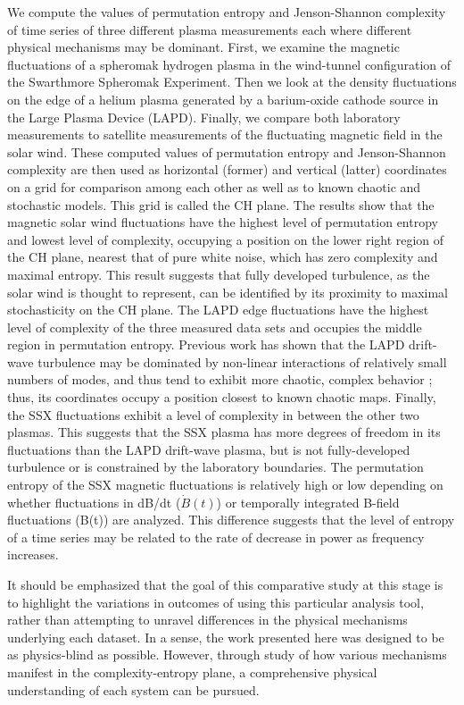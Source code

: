 \documentclass[aps,prx,twocolumn,secnumarabic,nobalancelastpage,amsmath,amssymb,
nofootinbib]{revtex4-1}
\begin{document}
We compute the values of permutation entropy and Jenson-Shannon complexity of time series of three different plasma measurements each where different physical mechanisms may be dominant. First, we examine the magnetic fluctuations of a spheromak hydrogen plasma in the wind-tunnel configuration of the Swarthmore Spheromak Experiment. Then we look at the density fluctuations on the edge of a helium plasma generated by a barium-oxide cathode source in the Large Plasma Device (LAPD). Finally, we compare both laboratory measurements to satellite measurements of the fluctuating magnetic field in the solar wind. These computed values of permutation entropy and Jenson-Shannon complexity are then used as horizontal (former) and vertical (latter) coordinates on a grid for comparison among each other as well as to known chaotic and stochastic models. This grid is called the CH plane. The results show that the magnetic solar wind fluctuations have the highest level of permutation entropy and lowest level of complexity, occupying a position on the lower right region of the CH plane, nearest that of pure white noise, which has zero complexity and maximal entropy. This result suggests that fully developed turbulence, as the solar wind is thought to represent, can be identified by its proximity to maximal stochasticity on the CH plane. The LAPD edge fluctuations have the highest level of complexity of the three measured data sets and occupies the middle region in permutation entropy. Previous work has shown that the LAPD drift-wave turbulence may be dominated by non-linear interactions of relatively small numbers of modes, and thus tend to exhibit more chaotic, complex behavior \cite{pace2008}; thus, its coordinates occupy a position closest to known chaotic maps. Finally, the SSX fluctuations exhibit a level of complexity in between the other two plasmas. This suggests that the SSX plasma has more degrees of freedom in its fluctuations than the LAPD drift-wave plasma, but is not fully-developed turbulence or is constrained by the laboratory boundaries. The permutation entropy of the SSX magnetic fluctuations is relatively high or low depending on whether fluctuations in dB/dt ($\dot{B}(t)$) or temporally integrated B-field fluctuations (B(t)) are analyzed. This difference suggests that the level of entropy of a time series may be related to the rate of decrease in power as frequency increases.

It should be emphasized that the goal of this comparative study at this stage is to highlight the variations in outcomes of using this particular analysis tool, rather than attempting to unravel differences in the physical mechanisms underlying each dataset. In a sense, the work presented here was designed to be as physics-blind as possible. However, through study of how various mechanisms manifest in the complexity-entropy plane, a comprehensive physical understanding of each system can be pursued.
\end{document}
